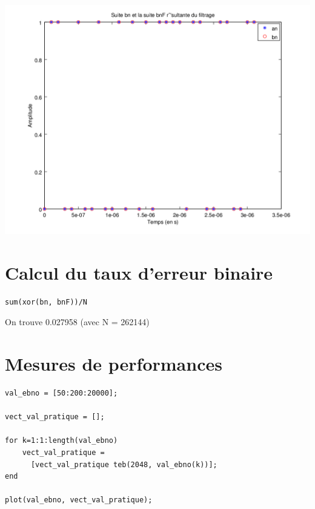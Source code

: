 \documentclass{acm_proc_article-sp}
\begin{document}
\begin{center}
\begin{center}
\begin{center}
\includegraphics[scale=0.45]{bn_bnF_14.png}
\end{center}

\section{Calcul du taux d'erreur binaire}

\begin{lstlisting}
sum(xor(bn, bnF))/N
\end{lstlisting}

On trouve 0.027958 (avec N = 262144)

\section{Mesures de performances}


\begin{center}
\begin{lstlisting}
val_ebno = [50:200:20000];

vect_val_pratique = [];

for k=1:1:length(val_ebno)
    vect_val_pratique = 
      [vect_val_pratique teb(2048, val_ebno(k))];
end

plot(val_ebno, vect_val_pratique);
\end{lstlisting}


\end{center}
\end{center}
\end{center}
\end{document}
